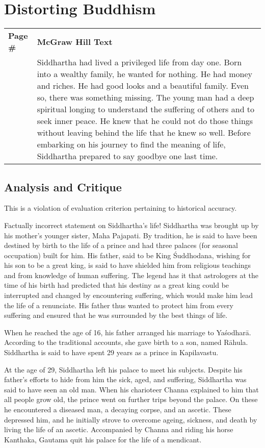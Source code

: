 \chapter{Distorting Buddhism}

\begin{longtable}{|>{\raggedleft}p{1.5cm}|p{8.5cm}|}
\multicolumn{2}{c}{\textbf{Table: 1}}\\
\hline
\textbf{Page \#} & \textbf{McGraw Hill Text} \tabularnewline
\hline 
260 & Siddhartha had lived a privileged life from day one. Born into a wealthy family, he wanted for nothing. He had money and riches. He had good looks and a beautiful family. Even so, there was something missing. The young man had a deep spiritual longing to understand the suffering of others and to seek inner peace. He knew that he could not do those things without leaving behind the life that he knew so well. Before embarking on his journey to find the meaning of life, Siddhartha prepared to say goodbye one last time.\tabularnewline
\hline
\end{longtable}
\vskip -10pt

\section*{Analysis and Critique} 
\vskip -5pt

This is a violation of evaluation criterion pertaining to historical accuracy.

Factually incorrect statement on Siddhartha's life! Siddhartha was brought up by his mother's younger sister, Maha Pajapati. By tradition, he is said to have been destined by birth to the life of a prince and had three palaces (for seasonal occupation) built for him. His father, said to be King Śuddhodana, wishing for his son to be a great king, is said to have shielded him from religious teachings and from knowledge of human suffering. The legend has it that astrologers at the time of his birth had predicted that his destiny as a great king could be interrupted and changed by encountering suffering, which would make him lead the life of a renunciate. His father thus wanted to protect him from every suffering and ensured that he was surrounded by the best things of life.

When he reached the age of 16, his father arranged his marriage to Yaśodharā. According to the traditional accounts, she gave birth to a son, named Rāhula. Siddhartha is said to have spent 29 years as a prince in Kapilavastu. 

At the age of 29, Siddhartha left his palace to meet his subjects. Despite his father's efforts to hide from him the sick, aged, and suffering, Siddhartha was said to have seen an old man. When his charioteer Channa explained to him that all people grow old, the prince went on further trips beyond the palace. On these he encountered a diseased man, a decaying corpse, and an ascetic. These depressed him, and he initially strove to overcome ageing, sickness, and death by living the life of an ascetic. Accompanied by Channa and riding his horse Kanthaka, Gautama quit his palace for the life of a mendicant.


